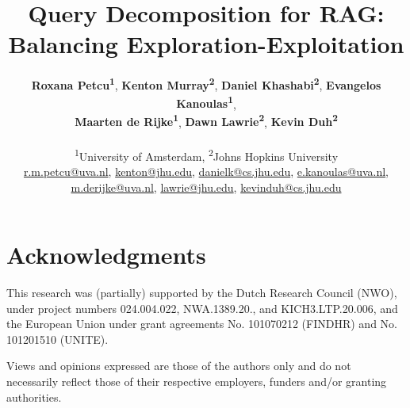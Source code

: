 \documentclass[11pt]{article}
\title{Query Decomposition for RAG: Balancing Exploration-Exploitation}
\author{
\textbf{Roxana Petcu\textsuperscript{1}},
\textbf{Kenton Murray\textsuperscript{2}},
\textbf{Daniel Khashabi\textsuperscript{2}},
\textbf{Evangelos Kanoulas\textsuperscript{1}},
\\
\textbf{Maarten de Rijke\textsuperscript{1}},
\textbf{Dawn Lawrie\textsuperscript{2}},
\textbf{Kevin Duh\textsuperscript{2}}
\\
\\
\textsuperscript{1}University of Amsterdam,
\textsuperscript{2}Johns Hopkins University
\\
\href{mailto:r.m.petcu@uva.nl}{r.m.petcu@uva.nl}, 
\href{mailto:kenton@jhu.edu}{kenton@jhu.edu}, 
\href{mailto:danielk@cs.jhu.edu}{danielk@cs.jhu.edu}, 
\href{mailto:e.kanoulas@uva.nl}{e.kanoulas@uva.nl},
\\ 
\href{mailto:m.derijke@uva.nl}{m.derijke@uva.nl}, 
\href{mailto:lawrie@jhu.edu}{lawrie@jhu.edu}, 
\href{mailto:kevinduh@cs.jhu.edu}{kevinduh@cs.jhu.edu}
}
\begin{document}
\maketitle









\section*{Acknowledgments}
This research was (partially) supported by the Dutch Research Council (NWO), under project numbers 024.004.022, NWA.1389.20., and KICH3.LTP.20.006, and the European Union under grant agreements No. 101070212 (FINDHR) and No. 101201510 (UNITE).

Views and opinions expressed are those of the authors only and do not necessarily reflect those of their respective employers, funders and/or granting authorities.



% 

\appendix

\end{document}
